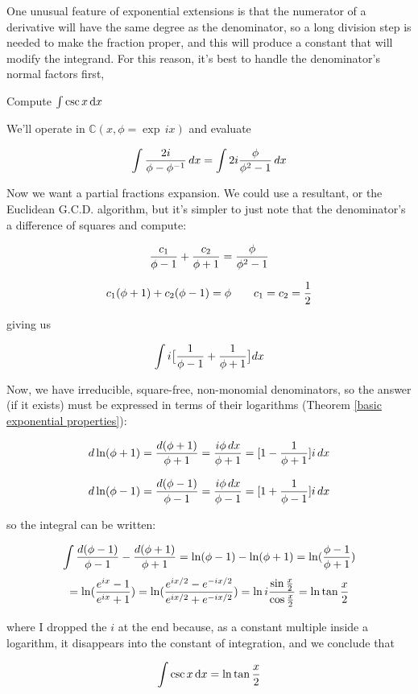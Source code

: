 One unusual feature of exponential extensions is that the numerator of
a derivative will have the same degree as the denominator, so a long
division step is needed to make the fraction proper, and this will
produce a constant that will modify the integrand.  For this reason,
it's best to handle the denominator's normal factors first,


\example Compute $\int \csc x \, {\rm d}x$

We'll operate in ${\mathbb C}(x, \phi = \exp \,ix)$ and evaluate

$$\int {{2i}\over{\phi - \phi^{-1}}} \,dx = \int 2i {{\phi}\over{\phi^2 - 1}} \,dx$$

Now we want a partial fractions expansion.  We could use a resultant,
or the Euclidean G.C.D. algorithm, but it's simpler to just note that
the denominator's a difference of squares and compute:

$${{c_1}\over{\phi-1}} + {{c_2}\over{\phi+1}} = {{\phi}\over{\phi^2-1}} $$

$${{c_1}(\phi+1)} + {{c_2}(\phi-1)} = \phi \qquad c_1 = c_2 = {1\over2} $$

giving us

$$\int i \big[ {{1}\over{\phi-1}} + {{1}\over{\phi+1}} \big] dx$$

Now, we have irreducible, square-free, non-monomial denominators, so
the answer (if it exists) must be expressed in terms of their
logarithms (Theorem \ref{basic exponential properties}):

$$ d \ln(\phi+1) = {{d(\phi+1)}\over{\phi+1}} = {{i\phi\,dx}\over{\phi+1}} = [1 - {{1}\over{\phi+1}}]i\,dx$$

$$ d \ln(\phi-1) = {{d(\phi-1)}\over{\phi-1}} = {{i\phi\,dx}\over{\phi-1}} = [1 + {{1}\over{\phi-1}}]i\,dx$$

so the integral can be written:

$$\int {{d(\phi-1)}\over{\phi-1}} - {{d(\phi+1)}\over{\phi+1}} = \ln (\phi-1) - \ln(\phi+1) = \ln({{\phi-1}\over{\phi+1}})$$
$$ = \ln ({{e^{ix}-1}\over{e^{ix}+1}}) = \ln ({{e^{ix/2}-e^{-ix/2}}\over{e^{ix/2}+e^{-ix/2}}}) = \ln i {{\sin {x\over2}}\over{\cos {x\over2}}} = \ln \tan {x\over2} $$

where I dropped the $i$ at the end because, as a constant multiple
inside a logarithm, it disappears into the constant of integration,
and we conclude that

$$\int \csc x \,{\rm d}x = \ln \tan {x\over2} $$

\endexample

\vfil\eject

